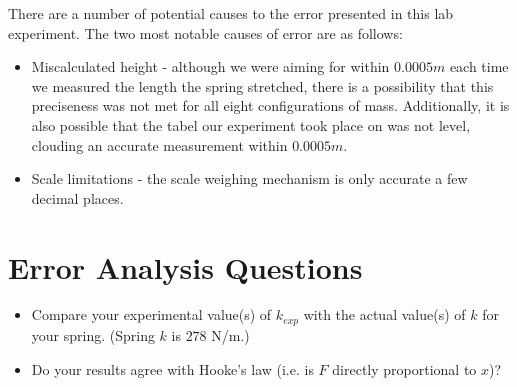 \noindent There are a number of potential causes to the error presented in this lab
experiment. The two most notable causes of error are as follows:

\begin{itemize}
  \item Miscalculated height - although we were aiming for within $0.0005m$ each time
        we measured the length the spring stretched, there is a possibility that this
        preciseness was not met for all eight configurations of mass. Additionally,
        it is also possible that the tabel our experiment took place on was not level,
        clouding an accurate measurement within $0.0005m$.
  
  \item Scale limitations - the scale weighing mechanism is only accurate a few
        decimal places.
  
\end{itemize}

\section{Error Analysis Questions}

\begin{itemize}
  \item Compare your experimental value(s) of $k_{exp}$ with the actual value(s) of $k$ for 
        your spring. (Spring $k$ is $278$ N/m.)
				
			\begin{center}
			\end{center}
	
  \item Do your results agree with Hooke's law (i.e. is $F$ directly proportional to 
        $x$)?

			\begin{center}
			\end{center}
\end{itemize}
\restoregeometry

